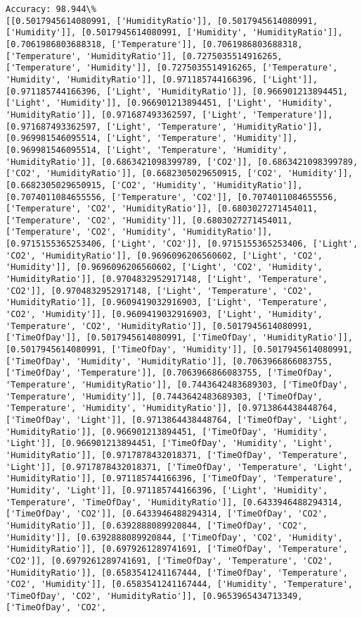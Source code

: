 \documentclass[11pt]{article}
\begin{document}
\begin{Verbatim}[commandchars=\\\{\}]
Accuracy: 98.944\%
[[0.5017945614080991, ['HumidityRatio']], [0.5017945614080991, ['Humidity']], [0.5017945614080991, ['Humidity', 'HumidityRatio']], [0.7061986803688318, ['Temperature']], [0.7061986803688318, ['Temperature', 'HumidityRatio']], [0.7275035514916265, ['Temperature', 'Humidity']], [0.7275035514916265, ['Temperature', 'Humidity', 'HumidityRatio']], [0.971185744166396, ['Light']], [0.971185744166396, ['Light', 'HumidityRatio']], [0.966901213894451, ['Light', 'Humidity']], [0.966901213894451, ['Light', 'Humidity', 'HumidityRatio']], [0.971687493362597, ['Light', 'Temperature']], [0.971687493362597, ['Light', 'Temperature', 'HumidityRatio']], [0.969981546095514, ['Light', 'Temperature', 'Humidity']], [0.969981546095514, ['Light', 'Temperature', 'Humidity', 'HumidityRatio']], [0.6863421098399789, ['CO2']], [0.6863421098399789, ['CO2', 'HumidityRatio']], [0.6682305029650915, ['CO2', 'Humidity']], [0.6682305029650915, ['CO2', 'Humidity', 'HumidityRatio']], [0.7074011084655556, ['Temperature', 'CO2']], [0.7074011084655556, ['Temperature', 'CO2', 'HumidityRatio']], [0.6803027271454011, ['Temperature', 'CO2', 'Humidity']], [0.6803027271454011, ['Temperature', 'CO2', 'Humidity', 'HumidityRatio']], [0.9715155365253406, ['Light', 'CO2']], [0.9715155365253406, ['Light', 'CO2', 'HumidityRatio']], [0.9696096206560602, ['Light', 'CO2', 'Humidity']], [0.9696096206560602, ['Light', 'CO2', 'Humidity', 'HumidityRatio']], [0.9704832952917148, ['Light', 'Temperature', 'CO2']], [0.9704832952917148, ['Light', 'Temperature', 'CO2', 'HumidityRatio']], [0.9609419032916903, ['Light', 'Temperature', 'CO2', 'Humidity']], [0.9609419032916903, ['Light', 'Humidity', 'Temperature', 'CO2', 'HumidityRatio']], [0.5017945614080991, ['TimeOfDay']], [0.5017945614080991, ['TimeOfDay', 'HumidityRatio']], [0.5017945614080991, ['TimeOfDay', 'Humidity']], [0.5017945614080991, ['TimeOfDay', 'Humidity', 'HumidityRatio']], [0.7063966866083755, ['TimeOfDay', 'Temperature']], [0.7063966866083755, ['TimeOfDay', 'Temperature', 'HumidityRatio']], [0.7443642483689303, ['TimeOfDay', 'Temperature', 'Humidity']], [0.7443642483689303, ['TimeOfDay', 'Temperature', 'Humidity', 'HumidityRatio']], [0.9713864438448764, ['TimeOfDay', 'Light']], [0.9713864438448764, ['TimeOfDay', 'Light', 'HumidityRatio']], [0.966901213894451, ['TimeOfDay', 'Humidity', 'Light']], [0.966901213894451, ['TimeOfDay', 'Humidity', 'Light', 'HumidityRatio']], [0.9717878432018371, ['TimeOfDay', 'Temperature', 'Light']], [0.9717878432018371, ['TimeOfDay', 'Temperature', 'Light', 'HumidityRatio']], [0.971185744166396, ['TimeOfDay', 'Temperature', 'Humidity', 'Light']], [0.971185744166396, ['Light', 'Humidity', 'Temperature', 'TimeOfDay', 'HumidityRatio']], [0.6433946488294314, ['TimeOfDay', 'CO2']], [0.6433946488294314, ['TimeOfDay', 'CO2', 'HumidityRatio']], [0.6392888089920844, ['TimeOfDay', 'CO2', 'Humidity']], [0.6392888089920844, ['TimeOfDay', 'CO2', 'Humidity', 'HumidityRatio']], [0.6979261289741691, ['TimeOfDay', 'Temperature', 'CO2']], [0.6979261289741691, ['TimeOfDay', 'Temperature', 'CO2', 'HumidityRatio']], [0.6583541241167444, ['TimeOfDay', 'Temperature', 'CO2', 'Humidity']], [0.6583541241167444, ['Humidity', 'Temperature', 'TimeOfDay', 'CO2', 'HumidityRatio']], [0.9653965434713349, ['TimeOfDay', 'CO2', 
\end{Verbatim}
\end{document}
